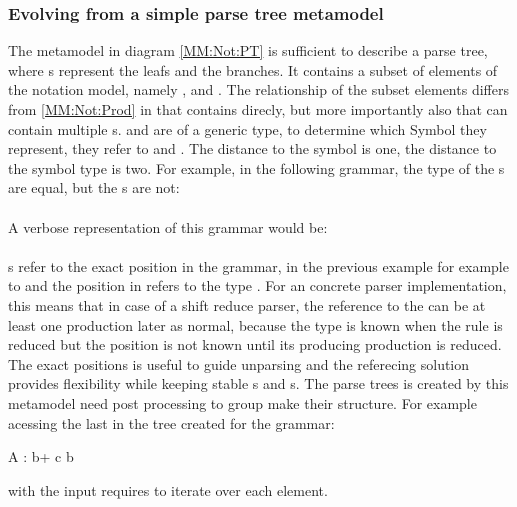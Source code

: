 \subsubsection{Evolving from a simple parse tree metamodel}The metamodel in diagram \ref{MM:Not:PT} is sufficient to describe a parse tree, where s represent the leafs and  the branches. It contains a subset of elements of the notation model, namely ,  and . The relationship of the subset elements differs from \ref{MM:Not:Prod} in that  contains  direcly, but more importantly also that  can contain multiple s.  and  are of a generic type, to determine which Symbol they represent, they refer to  and . The distance to the symbol is one, the distance to the symbol type is two. 
For example, in the following grammar, the type of the s are equal, but the s are not:\\
 \\
A verbose representation of this grammar would be: \\
 \\
s refer to the exact position in the grammar, in the previous example for example to  and the position in refers to the type . For an concrete parser implementation, this means that in case of a shift reduce parser, the reference to the  can be at least one production later as normal, because the type is known when the rule is reduced but the position is not known until its producing production is reduced. The exact positions is useful to guide unparsing and the referecing solution provides flexibility while keeping stable s and s. The parse trees is created by this metamodel need post processing to group make their structure. For example acessing the last  in the tree created for the grammar:\\
\begin{xtxt}
A : b+ c b 
\end{xtxt}
with the input  requires to iterate over each element. 

